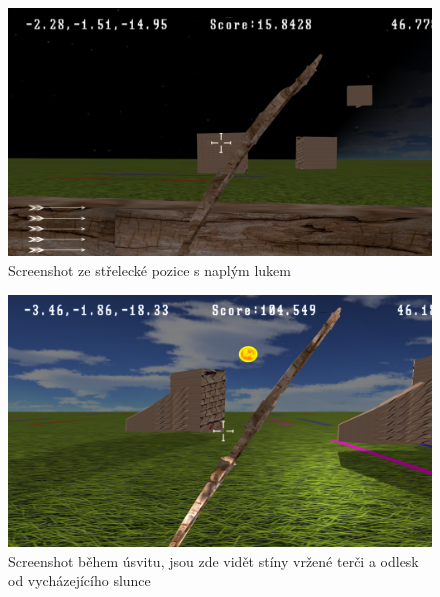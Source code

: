 \begin{figure}
	\begin{center}
		\includegraphics[scale=0.35]{obrazky-figures/22}
		
		\caption{Screenshot ze střelecké pozice s naplým lukem}\label{screenShot1}
\end{center}\end{figure}
\begin{figure}
	\begin{center}
			\includegraphics[scale=0.35]{obrazky-figures/23}
		\caption{Screenshot během úsvitu, jsou zde vidět stíny vržené terči a odlesk od vycházejícího slunce}\label{screenShot2}
\end{center}\end{figure}
